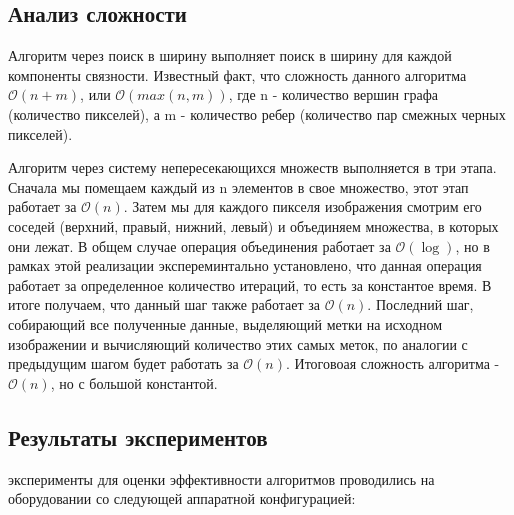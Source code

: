 \documentclass{report}
\begin{document}
\subsection*{Анализ сложности}
\par Алгоритм через поиск в ширину выполняет поиск в ширину для каждой компоненты связности. Известный факт, что сложность данного алгоритма $\mathcal{O}(n + m)$, или $\mathcal{O}(max(n,m))$, где n - количество вершин графа (количество пикселей), а m - количество ребер (количество пар смежных черных пикселей).
\par Алгоритм через систему непересекающихся множеств выполняется в три этапа. Сначала мы помещаем каждый из n элементов в свое множество, этот этап работает за $\mathcal{O}(n)$. Затем мы для каждого пикселя изображения смотрим его соседей (верхний, правый, нижний, левый) и объединяем множества, в которых они лежат. В общем случае операция объединения работает за $\mathcal{O}(\log)$, но в рамках этой реализации экспереминтально установлено, что данная операция работает за определенное количество итераций, то есть за константое время. В итоге получаем, что данный шаг также работает за $\mathcal{O}(n)$. Последний шаг, собирающий все полученные данные, выделяющий метки на исходном изображении и вычисляющий количество этих самых меток, по аналогии с предыдущим шагом будет работать за $\mathcal{O}(n)$. Итоговоая сложность алгоритма - $\mathcal{O}(n)$, но с большой константой.


\subsection*{Результаты экспериментов}

 эксперименты для оценки эффективности алгоритмов проводились на оборудовании со следующей аппаратной конфигурацией:
\end{document}
